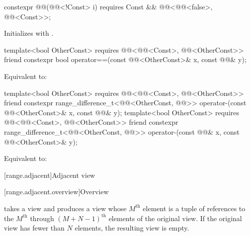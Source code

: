 %
\begin{itemdecl}
constexpr @@(@@<!Const> i)
  requires Const && @@<@@<false>, @@<Const>>;
\end{itemdecl}

\begin{itemdescr}
\pnum
\effects
Initializes  with .
\end{itemdescr}

%
\begin{itemdecl}
template<bool OtherConst>
  requires @@<@@<Const>, @@<OtherConst>>
friend constexpr bool operator==(const @@<OtherConst>& x, const @@& y);
\end{itemdecl}

\begin{itemdescr}
\pnum
\effects
Equivalent to: 
\end{itemdescr}

%
\begin{itemdecl}
template<bool OtherConst>
  requires @@<@@<Const>, @@<OtherConst>>
friend constexpr range_difference_t<@@<OtherConst, @@>>
  operator-(const @@<OtherConst>& x, const @@& y);
template<bool OtherConst>
  requires @@<@@<Const>, @@<OtherConst>>
friend constexpr range_difference_t<@@<OtherConst, @@>>
  operator-(const @@& x, const @@<OtherConst>& y);
\end{itemdecl}

\begin{itemdescr}
\pnum
\effects
Equivalent to: 
\end{itemdescr}

[range.adjacent]{Adjacent view}

[range.adjacent.overview]{Overview}

\pnum
{} takes a view and
produces a view whose $M^\text{th}$ element is
a tuple of references to
the $M^\text{th}$ through $(M + N - 1)^\text{th}$ elements of
the original view.
If the original view has fewer than $N$ elements, the resulting view is empty.

